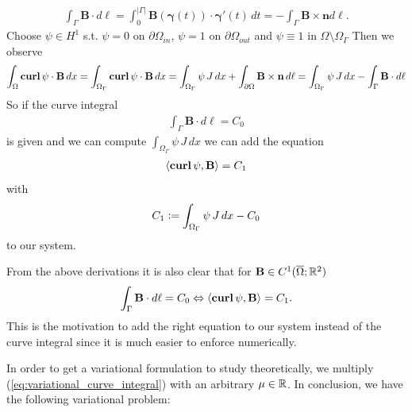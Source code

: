 \documentclass[../master_thesis.tex]{subfiles}
\begin{document}
\begin{align*}
    \int_\Gamma \mathbf{B}\cdot d\ell= \int_0^{|\Gamma|} \mathbf{B}(\bm{\gamma}(t)) \cdot \bm{\gamma}'(t) \, dt 
    = -\int_\Gamma  \mathbf{B}\times \mathbf{n} d\ell.
\end{align*}
Choose $\psi \in H^1$ s.t. $\psi = 0$ on $\partial \Omega_{in}$, $\psi = 1$ on 
$\partial \Omega_{out}$ and $\psi \equiv 1$ in $\Omega \setminus \Omega_\Gamma$
Then we observe 
\begin{align*}
    \int_\Omega \veccurl \psi \cdot \mathbf{B} \, dx = 
    \int_{\Omega_\Gamma} \veccurl \psi \cdot \mathbf{B} \, dx = 
    \int_{\Omega_\Gamma} \psi \, J \, dx + \int_{\partial\Omega} \mathbf{B} \times \mathbf{n}\, d\ell
    = \int_{\Omega_\Gamma} \psi \, J \, dx - \int_\Gamma \mathbf{B}\cdot d\ell
\end{align*}
So if the curve integral 
\begin{align*}
    \int_\Gamma \mathbf{B} \cdot d\ell = C_0
\end{align*}
is given and we can compute $\int_{\Omega_\Gamma} \psi \, J \, dx$
we can add the equation
\begin{align}
    \langle \veccurl \psi, \mathbf{B} \rangle = C_1 \label{eq:variational_curve_integral}
\end{align}
with 
\begin{align*}
    C_1 \vcentcolon= \int_{\Omega_\Gamma} \psi \, J \, dx - C_0
\end{align*}
to our system.

From the above derivations it is also clear that for $\mathbf{B} \in C^1(\overline{\Omega};\real^2)$ 
\begin{align*}
    \int_\Gamma \mathbf{B} \cdot d\ell = C_0 
    \Leftrightarrow \langle \veccurl \psi, \mathbf{B} \rangle = C_1.
\end{align*}
This is the motivation to add the right equation to our system instead
of the curve integral since it is much easier 
to enforce numerically.

In order to get a variational 
formulation to study theoretically,
 we multiply (\ref{eq:variational_curve_integral}) with an arbitrary $\mu \in \real$. 
In conclusion, we have the following variational problem:
\end{document}
